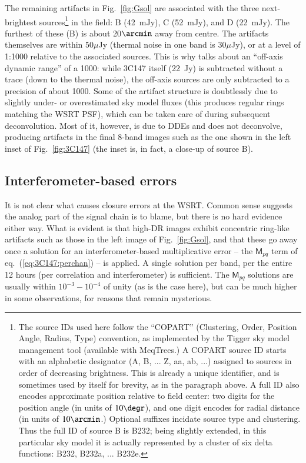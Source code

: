 \documentclass[]{aa}
\newcommand{\coh}[2]{\mathsf{{#1}}_{{#2}}}
\begin{document}
The remaining artifacts in Fig.~\ref{fig:Gsol} are associated with the three next-brightest sources\footnote{The source IDs used here follow the ``COPART'' (Clustering, Order, Position Angle, Radius, Type) convention, as implemented by the Tigger sky model management tool (available with MeqTrees.) A COPART source ID starts with an alphabetic designator (A, B, ... Z, aa, ab, ...) assigned to sources in order of decreasing brightness. This is already a unique identifier, and is sometimes used by itself for brevity, as in the paragraph above. A full ID also encodes approximate position relative to field center: two digits for the position angle (in units of $10\degr$), and one digit encodes for radial distance (in units of $10\arcmin$.) Optional suffixes incidate source type and clustering. Thus the full ID of source B is B232; being slightly extended, in this particular sky model it is actually represented by a cluster of six delta functions: B232, B232a, ... B232e.} in 
the field: B (42~mJy), C (52~mJy), and D (22~mJy). The furthest of these (B) is about 20$\arcmin$ away from centre. The artifacts themselves are within $50 \mu$Jy (thermal noise in one band is $30 \mu$Jy), or at a level of 1:1000 relative to the associated sources. This is why \citet{deBruyn:million} talks about an ``off-axis dynamic range'' of a 1000: while 3C147 itself (22~Jy) is subtracted without a trace (down to the thermal noise), the off-axis sources are only subtracted to a precision of about 1000. Some of the artifact structure is doubtlessly due to slightly under- or overestimated sky model fluxes (this produces regular rings matching the WSRT PSF), which can be taken care of during subsequent deconvolution. Most of it, however, is due to DDEs and does not deconvolve, producing artifacts in the final 8-band images such as the one shown in the left inset of Fig.~\ref{fig:3C147} (the inset is, in fact, a close-up of source B).

\subsection{Interferometer-based errors\label{sec:3C147:closure-errors}}

It is not clear what causes closure errors at the WSRT. Common sense suggests the analog part of the signal chain is to blame, but there is no hard evidence either way. What is evident is that high-DR images exhibit concentric ring-like artifacts such as those in the left image of Fig.~\ref{fig:Gsol}, and that these go away once a solution for an interferometer-based  multiplicative error -- the $\coh{M}{pq}$ term of eq.~(\ref{eq:3C147:perchan}) -- is applied. A single solution per band, per the entire 12 hours (per correlation and interferometer) is sufficient. The $\coh{M}{pq}$ solutions are usually within $10^{-3}-10^{-4}$ of unity (as is the case here), but can be much higher in some observations, for reasons that remain mysterious. 
\end{document}

